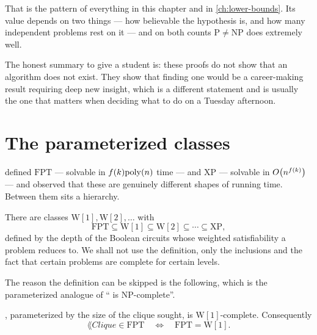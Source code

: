 That is the pattern of everything in this chapter and in
\cref{ch:lower-bounds}. Its value depends on two things --- how believable the
hypothesis is, and how many independent problems rest on it --- and on both
counts $\mathrm{P} \ne \mathrm{NP}$ does extremely well.

\begin{intuition}
The honest summary to give a student is: these proofs do not show that an
algorithm does not exist. They show that finding one would be a career-making
result requiring deep new insight, which is a different statement and is
usually the one that matters when deciding what to do on a Tuesday afternoon.
\end{intuition}

\section{The parameterized classes}
\label{sec:parameterized-classes}

 defined $\mathrm{FPT}$ --- solvable in $f(k)\mathrm{poly}(n)$ time ---
and $\mathrm{XP}$ --- solvable in $O\!\left(n^{f(k)}\right)$ --- and observed that
these are genuinely different shapes of running time. Between them sits a
hierarchy.

\begin{definition}\label{def:w-hierarchy-again}
There are classes $\mathrm{W}[1], \mathrm{W}[2], \ldots$ with
\[ \mathrm{FPT} \subseteq \mathrm{W}[1] \subseteq \mathrm{W}[2] \subseteq
   \cdots \subseteq \mathrm{XP}, \]
defined by the depth of the Boolean circuits whose weighted satisfiability a
problem reduces to. We shall not use the definition, only the inclusions and
the fact that certain problems are complete for certain levels.
\end{definition}

The reason the definition can be skipped is the following, which is the
parameterized analogue of `` is \textrm{NP}-complete''.

\begin{theorem}\label{thm:clique-w1}
, parameterized by the size of the clique sought, is
$\mathrm{W}[1]$-complete. Consequently
\[ \lang{Clique} \in \mathrm{FPT}
   \quad\Longleftrightarrow\quad
   \mathrm{FPT} = \mathrm{W}[1]. \]
\end{theorem}

